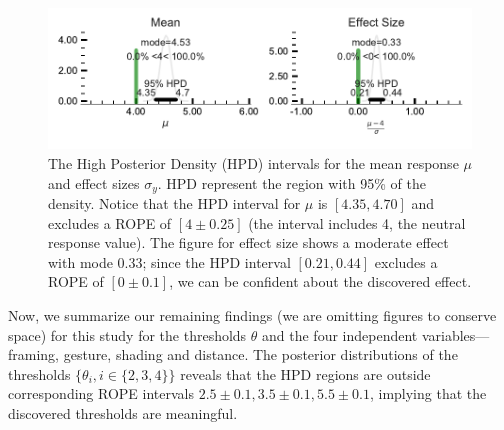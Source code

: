 \begin{figure}[tb]
	\centering
	\includegraphics[width=\columnwidth]{./hari-code/factors_mean_effect_main-noint.pdf}
	\caption{The High Posterior Density (HPD) intervals for the mean response $\mu$ and effect sizes $\sigma_y$. HPD represent the region with 95\% of the density. Notice that the HPD interval for $\mu$ is $[4.35, 4.70]$ and excludes a ROPE of $[4\pm 0.25]$ (the interval includes 4, the neutral response value). The figure for effect size shows a moderate effect with mode $0.33$; since the HPD interval $[0.21, 0.44]$ excludes a ROPE of $[0\pm 0.1]$, we can be confident about the discovered effect.}
	\label{fig:mean-effect}
\end{figure}
Now, we summarize our remaining findings (we are omitting figures to conserve space) for this study for the thresholds $\theta$ and the four independent variables---framing, gesture, shading and distance. The posterior distributions of the thresholds $\{\theta_i, i \in \{2,3,4\}\}$ reveals that the HPD regions are outside corresponding ROPE intervals $2.5 \pm 0.1, 3.5 \pm 0.1, 5.5 \pm 0.1$, implying that the discovered thresholds are meaningful.






